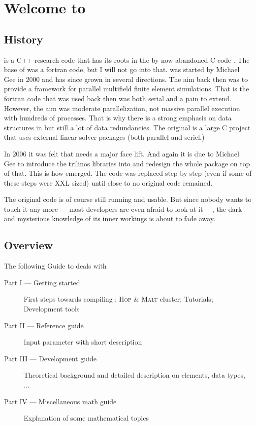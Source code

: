 \chapter{Welcome to \baci{}}

\section{History}

\baci{} is a C++ research code that has its roots in the by now abandoned
C code \ccarat{}. The base of \ccarat{} was a fortran code, but I will not go
into that. \ccarat{} was started by Michael Gee in 2000 and has since grown in
several directions. The aim back then was to provide a framework for parallel
multifield finite element simulations. That is the fortran code that was used
back then was both serial and a pain to extend. However, the aim was moderate
parallelization, not massive parallel execution with hundreds of
processes. That is why there is a strong emphasis on data structures in
\ccarat{} but still a lot of data redundancies. The original \ccarat{} is a
large C project that uses external linear solver packages (both parallel and
seriel.)

In 2006 it was felt that \ccarat{} needs a major face lift. And again
it is due to Michael Gee to introduce the trilinos libraries into
\ccarat{} and redesign the whole package on top of that. This is how \baci{}
emerged. The \ccarat{} code was replaced step by step (even if some of these
steps were XXL sized) until close to no original code remained.

The original \ccarat{} code is of course still running and usable. But since
nobody wants to touch it any more --- most developers are even afraid to look
at it ---, the dark and mysterious knowledge of its inner workings is about to
fade away.

\section{Overview}

The following Guide to \ccarat{} deals with

\begin{description}
\item[Part I --- Getting started] First steps towards compiling \ccarat{}; \textsc{Hop
  \& Malt} cluster; Tutorials;
  Development tools 
\item[Part II --- Reference guide] Input parameter with short description
\item[Part III --- Development guide] Theoretical background and detailed
  description   on elements, data types, ...
\item[Part IV --- Miscellaneous math guide] Explanation of some mathematical topics
\end{description}
